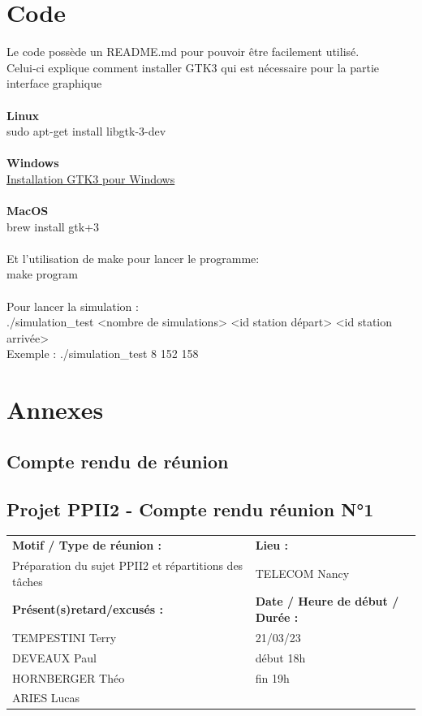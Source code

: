 \documentclass[12pt,titlepage]{report}
\begin{document}
\newpage
\chapter{Code}

Le code possède un README.md pour pouvoir être facilement utilisé. \\
Celui-ci explique comment installer GTK3 qui est nécessaire pour la partie interface graphique  
\\
\\
\textbf{Linux} \\
sudo apt-get install libgtk-3-dev \\ 
\\
\textbf{Windows} \\
\href{https://www.gtk.org/docs/installations/windows/}{Installation GTK3 pour Windows} \\ 
\\
\textbf{MacOS} \\
brew install gtk+3 \\ \\
Et l'utilisation de make pour lancer le programme: \\
make program \\
\\
Pour lancer la simulation :\\
./simulation\_test <nombre de simulations> <id station départ> <id station arrivée>\\
Exemple : ./simulation\_test 8 152 158
\chapter{Annexes}

\section{Compte rendu de réunion}

\section*{Projet PPII2 - Compte rendu réunion N°1}
\begin{tabular}{|p{7cm}|p{6cm}|}
    \hline
    \textbf{Motif / Type de réunion :}
    & \textbf{Lieu :}
    \\
    Préparation du sujet PPII2 et répartitions des tâches 
    & 
    TELECOM Nancy
    \\ \hline
    \textbf{Présent(s)retard/excusés :}
    &
    \textbf{Date / Heure de début / Durée :}
    \\ 
    TEMPESTINI Terry &  21/03/23\\  
    DEVEAUX Paul & début 18h\\
    HORNBERGER Théo & fin 19h\\
    ARIES Lucas & 
    \\ \hline
\end{tabular}
\end{document}
